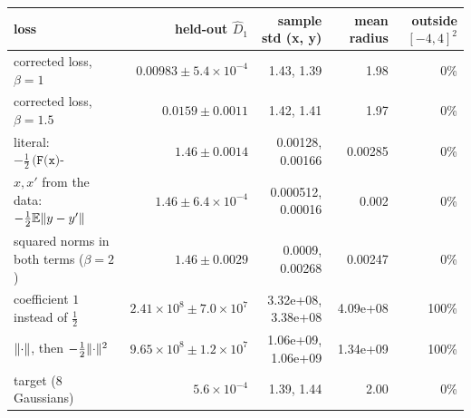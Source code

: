 \begin{tabular}{lrrrr}
\toprule
loss & held-out $\widehat D_1$ & sample std (x, y) & mean radius & outside $[-4,4]^2$\\
\midrule
corrected loss, $\beta=1$ & $0.00983\pm5.4\times10^{-4}$ & 1.43, 1.39 & 1.98 & 0\%\\
corrected loss, $\beta=1.5$ & $0.0159\pm0.0011$ & 1.42, 1.41 & 1.97 & 0\%\\
literal: $-\tfrac12\,\texttt{(F(x)-F(x')).mean()}$ & $1.46\pm0.0014$ & 0.00128, 0.00166 & 0.00285 & 0\%\\
$x,x'$ from the data: $-\tfrac12\mathbb{E}\lVert y-y'\rVert$ & $1.46\pm6.4\times10^{-4}$ & 0.000512, 0.00016 & 0.002 & 0\%\\
squared norms in both terms ($\beta=2$) & $1.46\pm0.0029$ & 0.0009, 0.00268 & 0.00247 & 0\%\\
coefficient $1$ instead of $\tfrac12$ & $2.41\times10^{8}\pm7.0\times10^{7}$ & 3.32e+08, 3.38e+08 & 4.09e+08 & 100\%\\
$\lVert \cdot\rVert$, then $-\tfrac12\lVert \cdot\rVert^2$ & $9.65\times10^{8}\pm1.2\times10^{7}$ & 1.06e+09, 1.06e+09 & 1.34e+09 & 100\%\\
\midrule
target (8 Gaussians) & $5.6\times10^{-4}$ & 1.39, 1.44 & 2.00 & 0\%\\
\bottomrule
\end{tabular}
